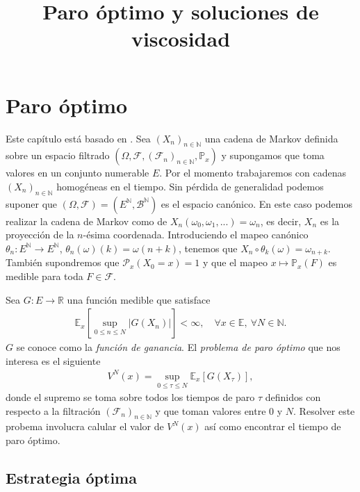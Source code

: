 \documentclass{article}
\title{Paro óptimo y soluciones de viscosidad}
\numberwithin{equation}{section}
\begin{document}
\maketitle

\section{Paro óptimo}




Este capítulo está basado en \cite{peskir2006optimal}. Sea $(X_n)_{n\in\mathbb{N}}$ una cadena de Markov definida sobre un espacio filtrado $(\Omega,\mathcal{F},(\mathcal{F}_n)_{n\in \mathbb{N}},\mathbb{P}_x)$ y supongamos que toma valores en un conjunto numerable $E$. Por el momento trabajaremos con cadenas $(X_n)_{n\in\mathbb{N}}$ homogéneas en el tiempo. Sin pérdida de generalidad podemos suponer que $(\Omega,\mathcal{F}) = (E^\mathbb{N},\mathcal{B}^\mathbb{N})$ es el espacio canónico. En este caso podemos realizar la cadena de Markov como de $X_n(\omega_0,\omega_1,...) = \omega_n$, es decir, $X_n$ es la proyección de la $n$-ésima coordenada. Introduciendo el mapeo canónico $\theta_n : E^{\mathbb{N}}\to E^{\mathbb{N}}$, $\theta_n(\omega)(k) = \omega(n+k)$, tenemos que $X_n\circ\theta_k(\omega) = \omega_{n+k}$. También supondremos que $\mathcal{P}_x(X_0 = x) = 1$ y que el mapeo $x\mapsto \mathbb{P}_x(F)$ es medible para toda $F \in \mathcal{F}$.

Sea $G : E \to \mathbb{R}$ una función medible que satisface 
\begin{align}\label{G-esperanza}
    \mathbb{E}_x\left[\sup_{0\leq n\leq N}|G(X_n)|\right] < \infty, \quad \forall x \in \mathbb{E},\: \forall N \in \mathbb{N}.
\end{align}
$G$ se conoce como la \emph{función de ganancia}. El \emph{problema de paro óptimo} que nos interesa es el siguiente
\begin{align}\label{paro-optimo}
    V^N(x) = \sup_{0\leq \tau \leq N}\mathbb{E}_x\left[G(X_\tau)\right],
\end{align}
donde el supremo se toma sobre todos los tiempos de paro $\tau$ definidos con respecto a la filtración $(\mathcal{F}_n)_{n\in\mathbb{N}}$ y que toman valores entre $0$ y $N$. Resolver este probema involucra calular el valor de $V^N(x)$ así como encontrar el tiempo de paro óptimo.

\subsection{Estrategia óptima}
\end{document}
